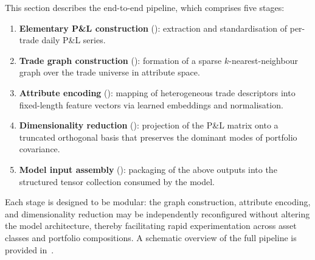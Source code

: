 \documentclass[11pt,a4paper]{article}
\begin{document}
This section describes the end-to-end pipeline, which comprises five stages:
%
\begin{enumerate}[label=(\roman*),nosep]
  \item \textbf{Elementary P\&L construction} ():
        extraction and standardisation of per-trade daily P\&L series.
  \item \textbf{Trade graph construction} ():
        formation of a sparse $k$-nearest-neighbour graph over the trade
        universe in attribute space.
  \item \textbf{Attribute encoding} ():
        mapping of heterogeneous trade descriptors into fixed-length feature
        vectors via learned embeddings and normalisation.
  \item \textbf{Dimensionality reduction} ():
        projection of the P\&L matrix onto a truncated orthogonal basis that
        preserves the dominant modes of portfolio covariance.
  \item \textbf{Model input assembly} ():
        packaging of the above outputs into the structured tensor collection
        consumed by the model.
\end{enumerate}
%
Each stage is designed to be modular: the graph construction, attribute
encoding, and dimensionality reduction may be independently reconfigured
without altering the model architecture, thereby facilitating rapid
experimentation across asset classes and portfolio compositions.  A schematic
overview of the full pipeline is provided in~.
\end{document}
